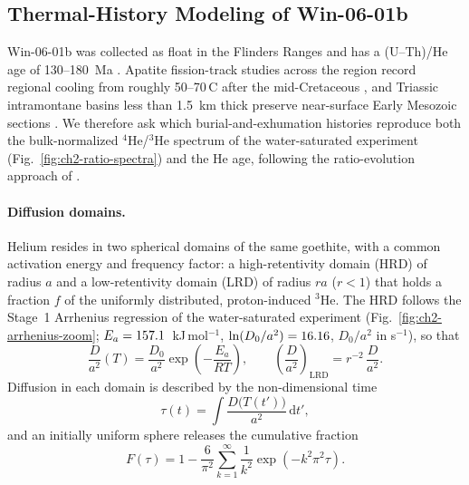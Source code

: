 
\subsection{Thermal-History Modeling of Win-06-01b}\label{sec:gt_thermal_methods}

Win-06-01b was collected as float in the Flinders Ranges and has a
(U--Th)/He age of 130--180~Ma \citep{waltenberg2012}. Apatite fission-track
studies across the region record regional cooling from roughly 50--70\,\textdegree C
after the mid-Cretaceous \citep{gibsonstuwe2000,mitchell1998}, and Triassic
intramontane basins less than 1.5~km thick preserve near-surface Early Mesozoic
sections \citep{mitchell1998}. We therefore ask which burial-and-exhumation
histories reproduce both the bulk-normalized $^4$He/$^3$He spectrum of the
water-saturated experiment (Fig.~\ref{fig:ch2-ratio-spectra}) and the He age,
following the ratio-evolution approach of \citet{shusterfarley2004}.

\paragraph{Diffusion domains.}
Helium resides in two spherical domains of the same goethite, with a common
activation energy and frequency factor: a high-retentivity domain (HRD) of
radius $a$ and a low-retentivity domain (LRD) of radius $r a$ ($r<1$) that holds
a fraction $f$ of the uniformly distributed, proton-induced $^3$He. The HRD
follows the Stage~1 Arrhenius regression of the water-saturated experiment
(Fig.~\ref{fig:ch2-arrhenius-zoom}; $E_a = 157.1$~kJ\,mol$^{-1}$,
$\ln(D_0/a^2) = 16.16$, $D_0/a^2$ in s$^{-1}$), so that
\begin{equation}
  \frac{D}{a^2}(T) = \frac{D_0}{a^2}\exp\!\left(-\frac{E_a}{RT}\right),
  \qquad
  \left(\frac{D}{a^2}\right)_{\mathrm{LRD}} = r^{-2}\,\frac{D}{a^2}.
  \label{eq:gt_th_arrhenius}
\end{equation}
Diffusion in each domain is described by the non-dimensional time
\begin{equation}
  \tau(t) = \int \frac{D\big(T(t')\big)}{a^2}\,\mathrm{d}t',
  \label{eq:gt_th_tau}
\end{equation}
and an initially uniform sphere releases the cumulative fraction
\citep{crank1979}
\begin{equation}
  F(\tau) = 1 - \frac{6}{\pi^2}\sum_{k=1}^{\infty}\frac{1}{k^2}\exp\!\left(-k^2\pi^2\tau\right).
  \label{eq:gt_th_F}
\end{equation}

